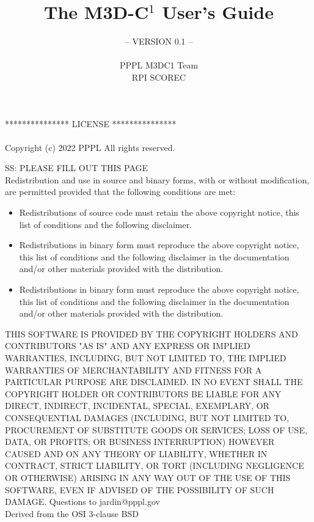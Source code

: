 \documentclass[11pt]{article}  %
\author{}
\title{}
\title{The M3D-C$^{1}$ User's Guide}
\author{-- VERSION 0.1 --\\
\\
PPPL M3DC1 Team \\
RPI SCOREC}
\begin{document}
\maketitle


\newpage

\newpage
***************     LICENSE     ***************
\\
\\
Copyright (c) 2022 PPPL
All rights reserved.
\newline
\newline

SS: PLEASE FILL OUT THIS PAGE\\
\newline
Redistribution and use in source and binary forms, with or without
modification, are permitted provided that the following conditions are met:

\begin{itemize}
\item Redistributions of source code must retain the above copyright notice,
  this list of conditions and the following disclaimer.

\item Redistributions in binary form must reproduce the above copyright notice,
  this list of conditions and the following disclaimer in the documentation
  and/or other materials provided with the distribution.

\item Redistributions in binary form must reproduce the above copyright notice,
  this list of conditions and the following disclaimer in the documentation
  and/or other materials provided with the distribution.
\end{itemize}

THIS SOFTWARE IS PROVIDED BY THE COPYRIGHT HOLDERS AND CONTRIBUTORS "AS IS"
AND ANY EXPRESS OR IMPLIED WARRANTIES, INCLUDING, BUT NOT LIMITED TO, THE
IMPLIED WARRANTIES OF MERCHANTABILITY AND FITNESS FOR A PARTICULAR PURPOSE ARE
DISCLAIMED. IN NO EVENT SHALL THE COPYRIGHT HOLDER OR CONTRIBUTORS BE LIABLE
FOR ANY DIRECT, INDIRECT, INCIDENTAL, SPECIAL, EXEMPLARY, OR CONSEQUENTIAL
DAMAGES (INCLUDING, BUT NOT LIMITED TO, PROCUREMENT OF SUBSTITUTE GOODS OR
SERVICES; LOSS OF USE, DATA, OR PROFITS; OR BUSINESS INTERRUPTION) HOWEVER
CAUSED AND ON ANY THEORY OF LIABILITY, WHETHER IN CONTRACT, STRICT LIABILITY,
OR TORT (INCLUDING NEGLIGENCE OR OTHERWISE) ARISING IN ANY WAY OUT OF THE USE
OF THIS SOFTWARE, EVEN IF ADVISED OF THE POSSIBILITY OF SUCH DAMAGE.
\newline
\newline
Questions to jardin@pppl.gov\\
Derived from the OSI 3-clause BSD
\newpage
\newpage
\end{document}
